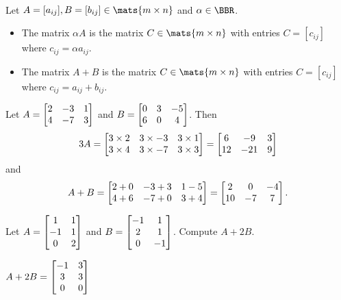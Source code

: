 \begin{df} \ \\
Let $A = [a_{ij}], B = [b_{ij}] \in
\mats{m\times n}$ and $\alpha\in \BBR$. 
\begin{itemize}
\item
The matrix $\alpha A$ is the matrix 
$C \in \mats{m\times n}$ with entries
$C = [c_{ij}]$ where $c_{ij} = \alpha a_{ij}$.
\item
The matrix $A + B$ is the matrix $C \in \mats{m\times n}$ with entries
$C = [c_{ij}]$ where $c_{ij} = a_{ij}+b_{ij}$.
\end{itemize}
\end{df}
\begin{exa}
Let $\displaystyle A = \begin{bmatrix}2 & -3 & 1 \cr 4 & -7 & 3 \cr\end{bmatrix}$ and 
$\displaystyle B = \begin{bmatrix}0 & 3 & -5 \cr 6 & 0 & 4 \cr\end{bmatrix}$.
Then 
 $$ 3 A = \begin{bmatrix}3\times2 & 3\times-3 & 3\times1 \cr 3\times4 & 3\times-7 & 3\times3 \cr\end{bmatrix}
=\begin{bmatrix}6 & -9 & 3 \cr 12 & -21 & 9 \cr\end{bmatrix}$$
and
$$A+B=\begin{bmatrix}2+0 & -3+3 & 1-5 \cr 4+6 & -7+0 & 3+4 \cr\end{bmatrix}
=\begin{bmatrix}2 & 0 & -4 \cr 10 & -7 & 7 \cr\end{bmatrix}.$$
\end{exa}

\begin{exer}
Let $A = \begin{bmatrix} 1 & 1 \cr -1 & 1 \cr 0 & 2 \cr
\end{bmatrix}$ and $B = \begin{bmatrix} -1 & 1 \cr 2 & 1 \cr 0 & -1 \cr
\end{bmatrix}$.
Compute $A+2B$.

\vspace*{1.5in}
\begin{answer}
$\displaystyle A + 2B = \begin{bmatrix} -1 & 3 \cr 3 & 3 \cr 0 & 0
\end{bmatrix}$
\end{answer}
\end{exer}


